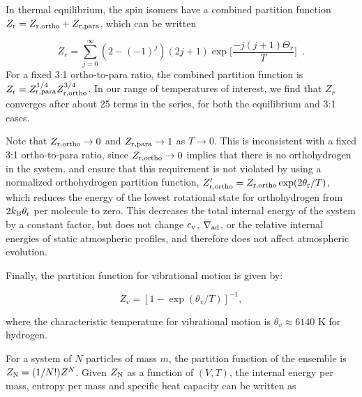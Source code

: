  In thermal equilibrium, the spin isomers have a combined partition function $Z_{\rm r}=Z_{\rm{r, ortho}}+Z_{\rm{r,para}}$, which can be written

\begin{equation}
\label{eq:Zrspin}
Z_r=\sum_{j=0}^\infty (2-(-1)^j) (2j+1) \exp{\Big[\frac{-j (j+1) \Theta_r}{T}\Big]} \;\;.
\end{equation}
For a fixed 3:1 ortho-to-para ratio, the combined partition function is $Z_{\rm r}=Z_{\rm r,para}^{1/4} Z_{\rm r, ortho}^{3/4}$. In our range of temperatures of interest, we find that $Z_r$ converges after about 25 terms in the series, for both the equilibrium and 3:1 cases.

Note that $Z_{\rm r, ortho} \rightarrow 0$ and $Z_{\rm r,para} \rightarrow 1$ as $T \rightarrow 0$. This is inconsistent with a fixed 3:1 ortho-to-para ratio, since $Z_{\rm r, ortho} \rightarrow 0$ implies that there is no orthohydrogen in the system. \citet{boley07} and \citet{dangelo13} ensure that this requirement is not violated by using a normalized orthohydrogen partition function,  $Z'_{\rm r, ortho}=Z_{\rm r, ortho} \exp(2 \theta_{\rm r}/T)$, which reduces the energy of the lowest rotational state for orthohydrogen from $2k_{\rm B}\theta_{\rm r}$ per molecule to zero. This decreases the total internal energy of the system by a constant factor, but does not change $c_{\rm v}$, $\nabla_{\rm ad}$, or the relative internal energies of static atmospheric profiles, and therefore does not affect atmospheric evolution.

Finally, the partition function for vibrational motion is given by:

\begin{equation}
\label{eq:Zv}
Z_v=[1-\exp{(\theta_v/T)}]^{-1},
\end{equation}

\noindent where the characteristic temperature for vibrational motion is $\theta_v  \approx 6140$ K for hydrogen. 

For a system of $N$ particles of mass $m$, the partition function of the ensemble is $Z_{\rm N}=(1/N!)Z^N$. Given $Z_{\rm N}$ as a function of $(V, T)$, the internal energy per mass, entropy per mass and specific heat capacity can be written as

%
%

